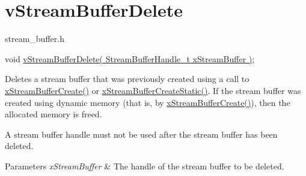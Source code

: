 \hypertarget{group__vStreamBufferDelete}{}\section{v\+Stream\+Buffer\+Delete}
\label{group__vStreamBufferDelete}
stream\+\_\+buffer.\+h


\begin{DoxyPre}
void \hyperlink{stream__buffer_8h_a05dc9d2ae220a050526a062eddf6d7a2}{vStreamBufferDelete( StreamBufferHandle\_t xStreamBuffer )};
\end{DoxyPre}


Deletes a stream buffer that was previously created using a call to \hyperlink{stream__buffer_8h_a39aa4dd8b83e2df7ded291f863fb5fed}{x\+Stream\+Buffer\+Create()} or \hyperlink{stream__buffer_8h_a3c248575ac1b83801db605b32a118f77}{x\+Stream\+Buffer\+Create\+Static()}. If the stream buffer was created using dynamic memory (that is, by \hyperlink{stream__buffer_8h_a39aa4dd8b83e2df7ded291f863fb5fed}{x\+Stream\+Buffer\+Create()}), then the allocated memory is freed.

A stream buffer handle must not be used after the stream buffer has been deleted.


\begin{DoxyParams}{Parameters}
{\em x\+Stream\+Buffer} & The handle of the stream buffer to be deleted. \\
\hline
\end{DoxyParams}
